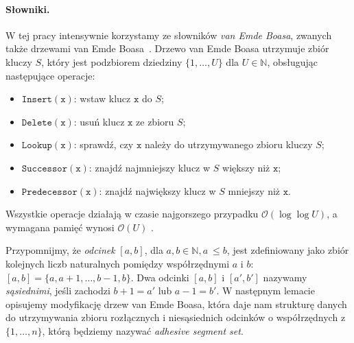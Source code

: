 \documentclass[runningheads]{llncs}
\newcommand{\Oh}{\mathcal{O}}
\renewcommand{\leq}{\leqslant}
\begin{document}
\paragraph*{Słowniki.}
W tej pracy intensywnie korzystamy ze słowników \emph{van Emde Boasa},
zwanych także {drzewami van Emde Boasa}~\cite{VANEMDEBOAS197780}. Drzewo
van Emde Boasa
utrzymuje zbiór kluczy $S$, który jest podzbiorem
dziedziny $\{ 1, \ldots, U \}$ dla $U\in \mathbb N$, obsługując następujące
operacje:
\begin{itemize}
 \item $\mathtt{Insert}(\mathtt{x})$:
    wstaw klucz $\mathtt{x}$ do $S$;
 \item $\mathtt{Delete}(\mathtt{x})$: usuń klucz $\mathtt{x}$
 ze zbioru $S$;
 \item $\mathtt{Lookup}(\mathtt{x})$: sprawdź, czy $\mathtt{x}$
 należy do utrzymywanego zbioru kluczy $S$;
 \item $\mathtt{Successor}(\mathtt{x})$: znajdź najmniejszy klucz w
 $S$ większy niż $\mathtt{x}$;
 \item $\mathtt{Predecessor}(\mathtt{x})$: znajdź największy klucz
 w $S$ mniejszy niż $\mathtt{x}$.
\end{itemize}
Wszystkie operacje działają w czasie najgorszego przypadku $\Oh(\log \log U)$, a
wymagana
pamięć wynosi $\Oh(U)$ \cite{VANEMDEBOAS197780}.

Przypomnijmy, że {\em{odcinek}} $[a,b]$, dla $a,b \in \mathbb{N}, a~\leq b$, jest zdefiniowany jako
zbiór kolejnych liczb naturalnych pomiędzy współrzędnymi $a$ i $b$:
$[a,b]= \{a, a+1, \ldots, b-1, b \}$. Dwa odcinki $[a,b]$ i
$[a',b']$ nazywamy
{\em{sąsiednimi}}, jeśli zachodzi $b+1=a'$ lub $a-1=b'$.
W następnym lemacie opisujemy modyfikację drzew van Emde Boasa, która daje
nam strukturę danych do utrzymywania zbioru
rozłącznych i niesąsiednich odcinków o współrzędnych z $\{ 1, \ldots, n \}$, którą będziemy nazywać {\em{adhesive segment set}}.
\end{document}
